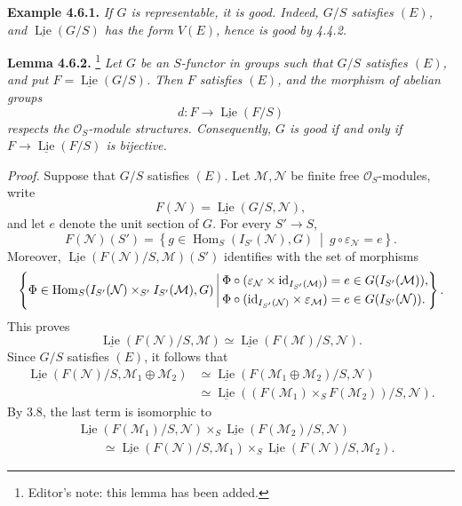 \medskip
\noindent\textbf{Example 4.6.1.}
\textit{If \(G\) is representable, it is good. Indeed, \(G/S\)
satisfies \((E)\), and \(\underline{\operatorname{Lie}}(G/S)\) has
the form \(V(E)\), hence is good by 4.4.2.}

\medskip
\noindent\textbf{Lemma 4.6.2.}
\footnote{Editor's note: this lemma has been added.}
\textit{Let \(G\) be an \(S\)-functor in groups such that \(G/S\)
satisfies \((E)\), and put
\(F=\underline{\operatorname{Lie}}(G/S)\). Then \(F\) satisfies
\((E)\), and the morphism of abelian groups}
\[
 d:F\longrightarrow\underline{\operatorname{Lie}}(F/S)
\]
\textit{respects the \(\mathcal O_S\)-module structures. Consequently,
\(G\) is good if and only if
\(F\to\underline{\operatorname{Lie}}(F/S)\) is bijective.}

\textit{Proof.}
Suppose that \(G/S\) satisfies \((E)\). Let
\(\mathcal M,\mathcal N\) be finite free \(\mathcal O_S\)-modules,
write
\[
 F(\mathcal N)=\underline{\operatorname{Lie}}(G/S,\mathcal N),
\]
and let \(e\) denote the unit section of \(G\). For every \(S'\to S\),
\[
 F(\mathcal N)(S')
 =
 \left\{
  g\in\operatorname{Hom}_S(I_{S'}(\mathcal N),G)
  \ \middle|\ g\circ\varepsilon_{\mathcal N}=e
 \right\}.
\]
Moreover,
\(\underline{\operatorname{Lie}}(F(\mathcal N)/S,\mathcal M)(S')\)
identifies with the set of morphisms
\[
\left\{
\begin{array}{@{}l@{\ }|@{\ }l@{}}
 \Phi\in
 \operatorname{Hom}_S
   (I_{S'}(\mathcal N)\times_{S'}I_{S'}(\mathcal M),G)
 &
 \begin{aligned}
 \Phi\circ
  (\varepsilon_{\mathcal N}\times
   \mathrm{id}_{I_{S'}(\mathcal M)})
   &=e\in G(I_{S'}(\mathcal M)),\\
 \Phi\circ
  (\mathrm{id}_{I_{S'}(\mathcal N)}\times
   \varepsilon_{\mathcal M})
   &=e\in G(I_{S'}(\mathcal N)).
 \end{aligned}
\end{array}
\right\}.
\]
This proves
\begin{equation*}
 \underline{\operatorname{Lie}}(F(\mathcal N)/S,\mathcal M)
 \simeq
 \underline{\operatorname{Lie}}(F(\mathcal M)/S,\mathcal N).
 \tag{1}
\end{equation*}
Since \(G/S\) satisfies \((E)\), it follows that
\[
\begin{aligned}
 \underline{\operatorname{Lie}}
   (F(\mathcal N)/S,\mathcal M_1\oplus\mathcal M_2)
 &\simeq
 \underline{\operatorname{Lie}}
   (F(\mathcal M_1\oplus\mathcal M_2)/S,\mathcal N)\\
 &\simeq
 \underline{\operatorname{Lie}}
   ((F(\mathcal M_1)\times_SF(\mathcal M_2))/S,\mathcal N).
\end{aligned}
\]
By 3.8, the last term is isomorphic to
\[
\begin{aligned}
 &\underline{\operatorname{Lie}}(F(\mathcal M_1)/S,\mathcal N)
 \times_S
 \underline{\operatorname{Lie}}(F(\mathcal M_2)/S,\mathcal N)\\
 &\qquad\simeq
 \underline{\operatorname{Lie}}(F(\mathcal N)/S,\mathcal M_1)
 \times_S
 \underline{\operatorname{Lie}}(F(\mathcal N)/S,\mathcal M_2).
\end{aligned}
\]

